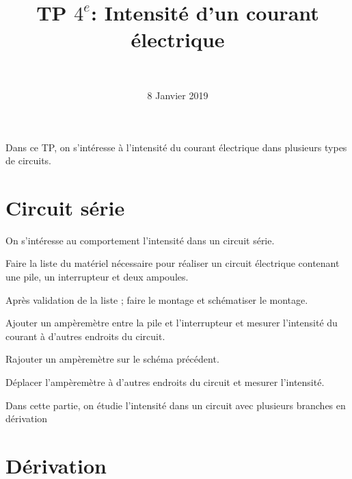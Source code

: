 \documentclass[a4paper,11pt]{exam}
\author{\ }
\date{8 Janvier 2019}
\title{TP $4^e$: Intensité d'un courant électrique}
\begin{document}
	\maketitle

Dans ce TP, on s'intéresse à l'intensité du courant électrique dans plusieurs types de circuits.
\section{Circuit série}\label{part:serie}

On s'intéresse au comportement l'intensité dans un circuit série.


\begin{questions}
	
	
	\question Faire la liste du matériel nécessaire pour réaliser un circuit électrique contenant une pile, un interrupteur et deux ampoules.
	
	\fillwithdottedlines{3cm}
	
	\question Après validation de la liste ; faire le montage et schématiser le montage.
	
	\makeemptybox{7cm}
	
	\question Ajouter un ampèremètre entre la pile et l'interrupteur et mesurer l'intensité du courant à d'autres endroits du circuit.
	\fillwithdottedlines{1cm}
	
	\question Rajouter un ampèremètre sur le schéma précédent.
	
	\question Déplacer l'ampèremètre à d'autres endroits du circuit et mesurer l'intensité.
	
	\fillwithdottedlines{3cm}
	
\end{questions}

Dans cette partie, on étudie l'intensité dans un circuit avec plusieurs branches en dérivation

\section{Dérivation}
\end{document}
